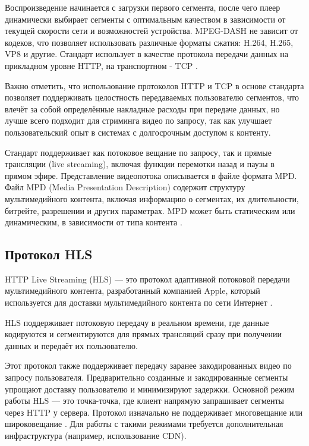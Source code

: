 	Воспроизведение начинается с загрузки первого сегмента, после чего плеер динамически выбирает сегменты с оптимальным качеством в зависимости от текущей скорости сети и возможностей устройства. MPEG-DASH не зависит от кодеков, что позволяет использовать различные форматы сжатия: H.264, H.265, VP8 и другие. Стандарт использует в качестве протокола передачи данных на прикладном уровне HTTP, на транспортном - TCP \cite{sodagarMpegDash}.
	
	Важно отметить, что использование протоколов HTTP и TCP в основе стандарта позволяет поддерживать целостность передаваемых пользователю сегментов, что влечёт за собой определённые накладные расходы при передаче данных, но лучше всего подходит для стриминга видео по запросу, так как улучшает пользовательский опыт в системах с долгосрочным доступом к контенту.
	
	Стандарт поддерживает как потоковое вещание по запросу, так и прямые трансляции (live streaming), включая функции перемотки назад и паузы в прямом эфире. Представление видеопотока описывается в файле формата MPD. Файл MPD (Media Presentation Description) содержит структуру мультимедийного контента, включая информацию о сегментах, их длительности, битрейте, разрешении и других параметрах. MPD может быть статическим или динамическим, в зависимости от типа контента \cite{sodagarMpegDash}.

\subsection{Протокол HLS}

	HTTP Live Streaming (HLS) — это протокол адаптивной потоковой передачи мультимедийного контента, разработанный компанией Apple, который используется для доставки мультимедийного контента по сети Интернет \cite{rfcHls}.
	
	HLS поддерживает потоковую передачу в реальном времени, где данные кодируются и сегментируются для прямых трансляций сразу при получении данных и передаёт их пользователю.
	
	Этот протокол также поддерживает передачу заранее закодированных видео по запросу пользователя. Предварительно созданные и закодированные сегменты упрощают доставку пользователю и минимизируют задержки. Основной режим работы HLS — это точка-точка, где клиент напрямую запрашивает сегменты через HTTP у сервера. Протокол изначально не поддерживает многовещание или широковещание \cite{rfcHls}. Для работы с такими режимами требуется дополнительная инфраструктура (например, использование CDN).
	

